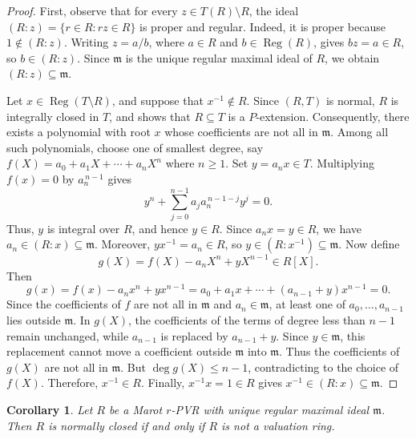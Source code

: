 \documentclass[12pt]{article}
\newtheorem{corollary}{Corollary}
\newcommand{\Reg}{\operatorname{Reg}}
\begin{document}
	\begin{proof}
		First, observe that for every $z\in T(R)\setminus R$, the ideal $(R:z)=\{r\in R:rz\in R\}$ is proper and regular. Indeed, it is proper because $1\notin(R:z)$. Writing $z=a/b$, where $a\in R$ and $b\in\Reg(R)$, gives $bz=a\in R$, so $b\in(R:z)$. Since $\mathfrak{m}$ is the unique regular maximal ideal of $R$, we obtain $(R:z)\subseteq\mathfrak{m}.$
		
		Let $x\in\Reg(T\setminus R)$, and suppose that $x^{-1}\notin R$. Since $(R,T)$ is normal, $R$ is integrally closed in $T$, and \cite[Theorem 1]{normal-pairs} shows that $R\subseteq T$ is a $P$-extension. Consequently, there exists a polynomial with root  $x$ whose coefficients are not all in $\mathfrak{m}$. Among all such polynomials, choose one of smallest degree, say $f(X)=a_0+a_1X+\cdots+a_nX^n$ where $ n\geq 1.$ Set $y=a_nx\in T$. Multiplying $f(x)=0$ by
		$a_n^{\,n-1}$ gives
		\[
		y^n+\sum_{j=0}^{n-1}
		a_j a_n^{\,n-1-j}y^j=0.
		\]
		Thus, $y$ is integral over $R$, and hence $y\in R$. Since $a_nx=y\in R$, we have $a_n\in(R:x)\subseteq\mathfrak{m}$. Moreover, $yx^{-1}=a_n\in R$, so $y\in(R:x^{-1})\subseteq\mathfrak{m}$. Now define $$g(X)=f(X)-a_nX^n+yX^{n-1}\in R[X]. $$ Then $$g(x)=f(x)-a_nx^n+yx^{n-1}=a_0+a_1x+\cdots+(a_{n-1}+y)x^{n-1}=0. $$ Since the coefficients of $f$ are not all in $\mathfrak{m}$ and $a_n\in\mathfrak{m}$, at least one of $a_0,\ldots,a_{n-1}$ lies outside $\mathfrak{m}$. In $g(X)$, the coefficients of the terms of degree less than $n-1$ remain unchanged, while $a_{n-1}$ is replaced by $a_{n-1}+y$. Since $y\in\mathfrak{m}$, this replacement cannot move a coefficient outside $\mathfrak{m}$ into $\mathfrak{m}$. Thus the coefficients of $g(X)$ are not all in $\mathfrak{m}$. But $\deg g(X)\leq n-1$, contradicting to the choice of $f(X)$. Therefore, $x^{-1}\in R$. Finally, $x^{-1}x=1\in R$ gives $x^{-1}\in(R:x)\subseteq\mathfrak{m}$.
	\end{proof}
	
	\begin{corollary}\label{rpvr-normally-closed}
		Let $R$ be a Marot $r$-PVR with unique regular maximal ideal $\mathfrak m$. Then $R$ is normally closed if and only if $R$ is not a valuation ring.
	\end{corollary}
	
\end{document}
